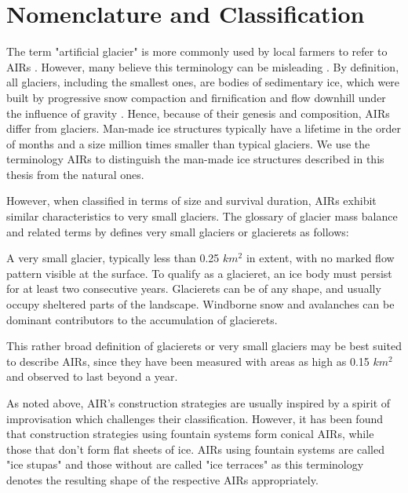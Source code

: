 \section{Nomenclature and Classification}

The term "artificial glacier" is more commonly used by local farmers to refer to \ac{AIRs}
\citep{norphelArtificialGlacierHigh2009}. However, many believe this terminology can be misleading
\citep{nusserSociohydrologyArtificialGlaciers2019}. By definition, all glaciers, including the smallest ones,
are bodies of sedimentary ice, which were built by progressive snow compaction and firnification and flow
downhill under the influence of gravity \citep{benndouglasGlaciersGlaciation2014}. Hence, because of their
genesis and composition, \ac{AIRs} differ from glaciers. Man-made ice structures typically have a lifetime in
the order of months and a size million times smaller than typical glaciers. We use the terminology \ac{AIRs} to
distinguish the man-made ice structures described in this thesis from the natural ones.

However, when classified in terms of size and survival duration, \ac{AIRs} exhibit similar characteristics to
very small glaciers. The glossary of glacier mass balance and related terms by
\citet{cogleyGlossaryGlacierMass2010} defines very small glaciers or glacierets as follows:

\begin{thesis_quotation}
	A very small glacier, typically less than 0.25 $km^2$ in extent, with no marked flow pattern
	visible at the surface. To qualify as a glacieret, an ice body must persist for at least two consecutive
	years. Glacierets can be of any shape, and usually occupy sheltered parts of the landscape. Windborne snow and
	avalanches can be dominant contributors to the accumulation of glacierets.
\end{thesis_quotation}

This rather broad definition of glacierets or very small glaciers may be best suited to describe AIRs, since
they have been measured with areas as high as 0.15 $km^2$ \citep{nusserSociohydrologyArtificialGlaciers2019} and
observed to last beyond a year.

As noted above, AIR's construction strategies are usually inspired by a spirit of improvisation which challenges
their classification. However, it has been found that construction strategies using fountain systems form
conical \ac{AIRs}, while those that don't form flat sheets of ice. \ac{AIRs} using fountain systems are called
"ice stupas" and those without are called "ice terraces" as this terminology denotes the resulting shape of the
respective \ac{AIRs} appropriately.

